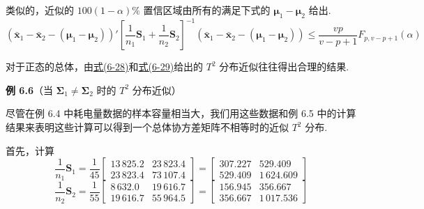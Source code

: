 类似的，近似的 $100(1-\alpha)\%$ 置信区域由所有的满足下式的 $\boldsymbol{\mu}_1-\boldsymbol{\mu}_2$ 给出.
\label{eq:6-30}
\begin{equation}
(\bar{\mathbf{x}}_1-\bar{\mathbf{x}}_2-(\boldsymbol{\mu}_1-\boldsymbol{\mu}_2))'\left[\frac{1}{n_1}\mathbf{S}_1+\frac{1}{n_2}\mathbf{S}_2\right]^{-1}(\bar{\mathbf{x}}_1-\bar{\mathbf{x}}_2-(\boldsymbol{\mu}_1-\boldsymbol{\mu}_2))\leqslant\frac{vp}{v-p+1}F_{p,v-p+1}(\alpha) \tag{6-30}
\end{equation}

对于正态的总体，由\hyperref[eq:6-28]{式(6-28)}和\hyperref[eq:6-29]{式(6-29)}给出的 $T^2$ 分布近似往往得出合理的结果.

\noindent\textbf{例 6.6}\quad （当 $\boldsymbol{\Sigma}_1\neq\boldsymbol{\Sigma}_2$ 时的 $T^2$ 分布近似）

尽管在例 6.4 中耗电量数据的样本容量相当大，我们用这些数据和例 6.5 中的计算结果来表明这些计算可以得到一个总体协方差矩阵不相等时的近似 $T^2$ 分布.

首先，计算
\[
\frac{1}{n_1}\mathbf{S}_1=\frac{1}{45}\begin{bmatrix}13\,825.2&23\,823.4\\23\,823.4&73\,107.4\end{bmatrix}=\begin{bmatrix}307.227&529.409\\529.409&1\,624.609\end{bmatrix}
\]
\[
\frac{1}{n_2}\mathbf{S}_2=\frac{1}{55}\begin{bmatrix}8\,632.0&19\,616.7\\19\,616.7&55\,964.5\end{bmatrix}=\begin{bmatrix}156.945&356.667\\356.667&1\,017.536\end{bmatrix}
\]
